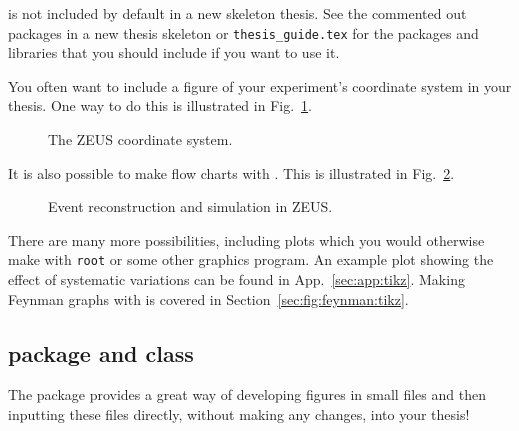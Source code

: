 \TikZ is not included by default in a new skeleton thesis. See the
commented out packages in a new thesis skeleton or
\texttt{thesis\_guide.tex} for the packages and \TikZ libraries that
you should include if you want to use it.

You often want to include a figure of your experiment's coordinate
system in your thesis. One way to do this is illustrated in
Fig.~\ref{fig:tikz:coord}.

\begin{figure}[htbp]
  \centering
   {%
  }{%
    
  }
  \caption{The ZEUS coordinate system.}
  \label{fig:tikz:coord}
\end{figure}

It is also possible to make flow charts with \TikZ. This is
illustrated in Fig.~\ref{fig:tikz:flow}.

\begin{figure}[htbp]
  \centering
   {%
  }{%
    
  }
  \caption[Event reconstruction and simulation in ZEUS]{Event reconstruction and simulation in ZEUS.}
  \label{fig:tikz:flow}
\end{figure}

There are many more possibilities,
including plots which you would otherwise make with \texttt{root} or
some other graphics program. An example plot showing the effect of
systematic variations can be found in App.~\ref{sec:app:tikz}. Making
Feynman graphs with \TikZ is covered in
Section~\ref{sec:fig:feynman:tikz}.


\subsection{ package and class}
\label{sec:fig:standalone}

The  package provides a great way of developing
figures in small files and then inputting these files directly,
without making any changes, into your thesis!

